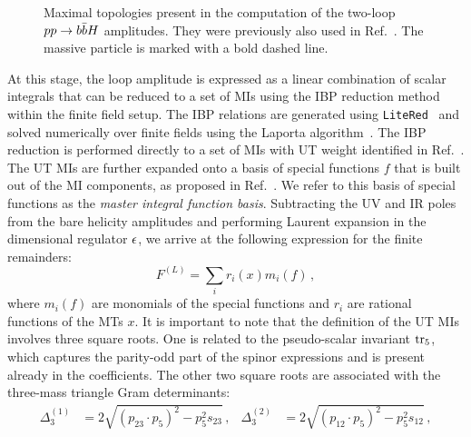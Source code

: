 \documentclass[main.tex]{subfiles}
\begin{document}
\begin{figure}
\begin{subfigure}{0.3\linewidth}
{
        }
    \end{subfigure}
    \caption{Maximal topologies present in the computation of the two-loop $pp \rightarrow b\bar{b}H$ amplitudes. They were previously also used in Ref.~\cite{Badger:2021nhg}. The massive particle is marked with a bold dashed line.}
    \label{fig:Hbbmaxtopos}
\end{figure}

At this stage, the loop amplitude is expressed as a linear combination of scalar integrals that can be reduced to a set of MIs using the IBP reduction method~\cite{Chetyrkin:1981qh} within the finite field setup. The IBP relations are generated using \texttt{LiteRed}~\cite{Lee:2012cn} and solved numerically over finite fields using the Laporta algorithm~\cite{Laporta:2001dd}. The IBP reduction is performed directly to a set of MIs with UT weight identified in Ref.~\cite{Abreu:2020jxa}. The UT MIs are further expanded onto a basis of special functions $f$ that is built out of the MI components, as proposed in Ref.~\cite{Badger:2021nhg}. We refer to this basis of special functions as the \textit{master integral function basis}.
Subtracting the UV and IR poles from the bare helicity amplitudes and performing Laurent expansion in the dimensional regulator $\epsilon$, we arrive at the following expression for the finite remainders:
\begin{equation}
F^{(L)} = \sum_{i} r_i(x) m_i(f)\,,
\label{eq:finrem}
\end{equation}
where $m_i(f)$ are monomials of the special functions and $r_i$ are rational functions of the MTs $x$. It is important to note that the definition of the UT MIs involves three square roots. One is related to the pseudo-scalar invariant $\operatorname{\rm tr}_5$, which captures the parity-odd part of the spinor expressions and is present already in the coefficients. The other two square roots are associated with the three-mass triangle Gram determinants:
\begin{align}
  \Delta_3^{(1)} &= 2 \sqrt{(p_{23} \cdot p_{5})^2 - p_5^2 s_{23}} \,,&
  \Delta_3^{(2)} &= 2 \sqrt{(p_{12} \cdot p_{5})^2 - p_5^2 s_{12}} \,,
  \label{eq:squareroots}
\end{align}
\end{document}
